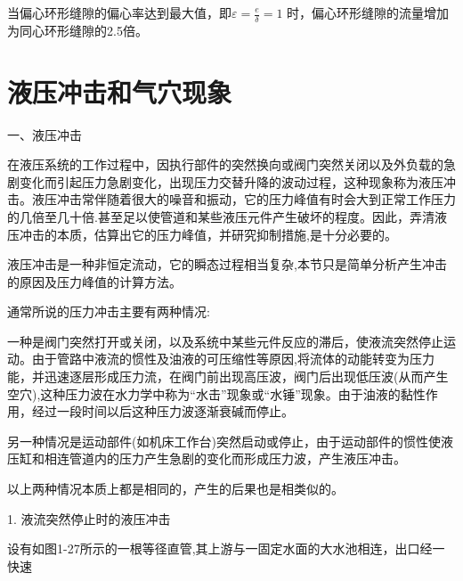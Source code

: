 当偏心环形缝隙的偏心率达到最大值，即$ \varepsilon =\frac{e}{\delta}=1 $ 时，偏心环形缝隙的流量增加为同心环形缝隙的2.5倍。

\section{液压冲击和气穴现象}

\noindent 一、液压冲击

在液压系统的工作过程中，因执行部件的突然换向或阀门突然关闭以及外负载的急剧变化而引起压力急剧变化，出现压力交替升降的波动过程，这种现象称为液压冲击。液压冲击常伴随着很大的噪音和振动，它的压力峰值有时会大到正常工作压力的几倍至几十倍.甚至足以使管道和某些液压元件产生破坏的程度。因此，弄清液压冲击的本质，估算出它的压力峰值，并研究抑制措施,是十分必要的。

液压冲击是一种非恒定流动，它的瞬态过程相当复杂,本节只是简单分析产生冲击的原因及压力峰值的计算方法。

通常所说的压力冲击主要有两种情况:

一种是阀门突然打开或关闭，以及系统中某些元件反应的滞后，使液流突然停止运动。由于管路中液流的惯性及油液的可压缩性等原因,将流体的动能转变为压力能，并迅速逐层形成压力流，在阀门前出现高压波，阀门后出现低压波(从而产生空穴),这种压力波在水力学中称为“水击”现象或“水锤”现象。由于油液的黏性作用，经过一段时间以后这种压力波逐渐衰碱而停止。

另一种情况是运动部件(如机床工作台)突然启动或停止，由于运动部件的惯性使液压缸和相连管道内的压力产生急剧的变化而形成压力波，产生液压冲击。

以上两种情况本质上都是相同的，产生的后果也是相类似的。

1. 液流突然停止时的液压冲击

设有如图1-27所示的一根等径直管,其上游与一固定水面的大水池相连，出口经一快速




